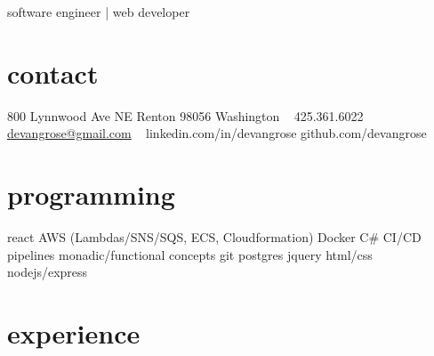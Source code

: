 \documentclass[]{friggeri-cv}
\begin{document}
       { software engineer | web developer }




\begin{aside}
  \section{contact}
    800 Lynnwood Ave NE
    Renton 98056
    Washington
    ~
    425.361.6022
    \href{mailto:devangrose@gmail.com}{devangrose@gmail.com}
    ~
    linkedin.com/in/devangrose
    github.com/devangrose
  \section{programming}
    react
    AWS (Lambdas/SNS/SQS, ECS, Cloudformation)
    Docker
    C\#
    CI/CD pipelines
    monadic/functional concepts
    git
    postgres
    jquery
    html/css
    nodejs/express

\end{aside}

\section{experience}
\end{document}
